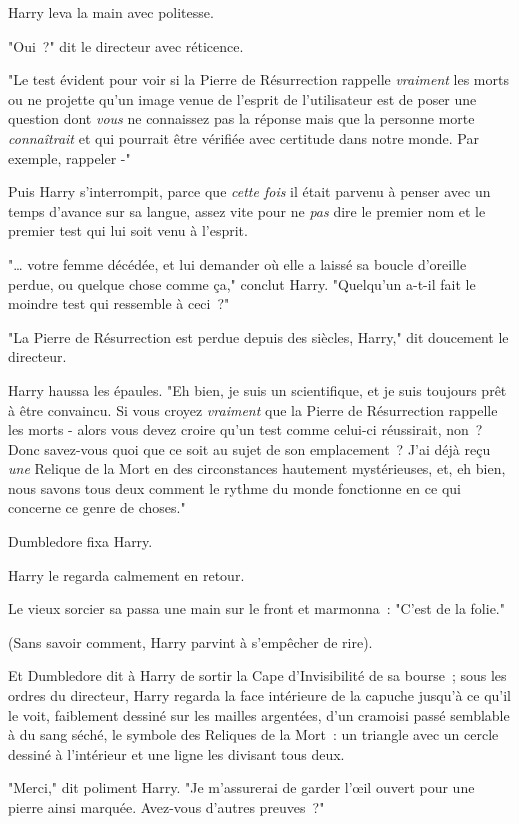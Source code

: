 Harry leva la main avec politesse.

"Oui~?" dit le directeur avec réticence.

"Le test évident pour voir si la Pierre de Résurrection rappelle \emph{vraiment} les morts ou ne projette qu'un image venue de l'esprit de l'utilisateur est de poser une question dont \emph{vous} ne connaissez pas la réponse mais que la personne morte \emph{connaîtrait} et qui pourrait être vérifiée avec certitude dans notre monde. Par exemple, rappeler -"

Puis Harry s'interrompit, parce que \emph{cette fois} il était parvenu à penser avec un temps d'avance sur sa langue, assez vite pour ne \emph{pas} dire le premier nom et le premier test qui lui soit venu à l'esprit.

"… votre femme décédée, et lui demander où elle a laissé sa boucle d'oreille perdue, ou quelque chose comme ça," conclut Harry. "Quelqu'un a-t-il fait le moindre test qui ressemble à ceci~?"

"La Pierre de Résurrection est perdue depuis des siècles, Harry," dit doucement le directeur.

Harry haussa les épaules. "Eh bien, je suis un scientifique, et je suis toujours prêt à être convaincu. Si vous croyez \emph{vraiment} que la Pierre de Résurrection rappelle les morts - alors vous devez croire qu'un test comme celui-ci réussirait, non~? Donc savez-vous quoi que ce soit au sujet de son emplacement~? J'ai déjà reçu \emph{une} Relique de la Mort en des circonstances hautement mystérieuses, et, eh bien, nous savons tous deux comment le rythme du monde fonctionne en ce qui concerne ce genre de choses."

Dumbledore fixa Harry.

Harry le regarda calmement en retour.

Le vieux sorcier sa passa une main sur le front et marmonna~: "C'est de la folie."

(Sans savoir comment, Harry parvint à s'empêcher de rire).

Et Dumbledore dit à Harry de sortir la Cape d'Invisibilité de sa bourse~; sous les ordres du directeur, Harry regarda la face intérieure de la capuche jusqu'à ce qu'il le voit, faiblement dessiné sur les mailles argentées, d'un cramoisi passé semblable à du sang séché, le symbole des Reliques de la Mort~: un triangle avec un cercle dessiné à l'intérieur et une ligne les divisant tous deux.

"Merci," dit poliment Harry. "Je m'assurerai de garder l'œil ouvert pour une pierre ainsi marquée. Avez-vous d'autres preuves~?"

